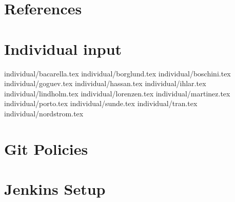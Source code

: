 \documentclass[11pt]{report}
\begin{document}
\chapter{References}

\appendix
\chapter{Individual input}

 {individual/bacarella.tex}
 {individual/borglund.tex}
 {individual/boschini.tex}
 {individual/goguev.tex}
 {individual/hassan.tex}
 {individual/ihlar.tex}
 {individual/lindholm.tex}
 {individual/lorenzen.tex}
 {individual/martinez.tex}
 {individual/porto.tex}
 {individual/sunde.tex}
 {individual/tran.tex}
 {individual/nordstrom.tex}

\chapter{Git Policies}

\chapter{Jenkins Setup}
\end{document}
